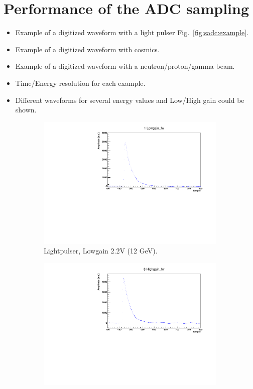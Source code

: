 \documentclass[12pt,a4paper, twocolumn]{article}
\newcommand{\Reffig}[1]{Fig.~\ref{#1}}
\begin{document}
\section{Performance of the ADC sampling}
\begin{itemize}
\item Example of a digitized waveform with a light pulser \Reffig{fig:sadc:example}.
\item Example of a digitized waveform with cosmics.
\item Example of a digitized waveform with a neutron/proton/gamma beam.
\item Time/Energy resolution for each example.
\item Different waveforms for several energy values  and Low/High gain could be shown.
\end{itemize}
\begin{figure} [htb]
\begin{subfigure}[b]{0.5\linewidth}
\includegraphics[width=\linewidth]{fig/Lowgain814.pdf}
\caption{Lightpulser, Lowgain 2.2V (12 GeV).}
\label{fig:sadc:2.2V_Low}
\end{subfigure}
\begin{subfigure}[b]{0.5\linewidth}
\includegraphics[width=\linewidth]{fig/Highgain815.pdf}

\end{subfigure}
\end{figure}
\end{document}
